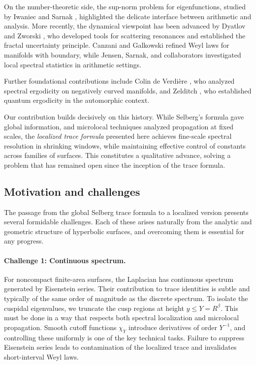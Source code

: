 On the number-theoretic side, the sup-norm problem for eigenfunctions, studied by Iwaniec
and Sarnak \cite{iwaniec1995}, highlighted the delicate interface between arithmetic and
analysis. More recently, the dynamical viewpoint has been advanced by Dyatlov and Zworski
\cite{dyatlov2018,dyatlov2019,zworski2012}, who developed tools for scattering resonances
and established the fractal uncertainty principle.  
Canzani and Galkowski \cite{canzani2019} refined Weyl laws for manifolds with boundary,
while Jensen, Sarnak, and collaborators \cite{jensen2021,sarnak2019} investigated local
spectral statistics in arithmetic settings.

Further foundational contributions include Colin de Verdière
\cite{colindeverdiere1985}, who analyzed spectral ergodicity on negatively curved
manifolds, and Zelditch \cite{zelditch1987}, who established quantum ergodicity in the
automorphic context.

Our contribution builds decisively on this history. While Selberg’s formula gave global
information, and microlocal techniques analyzed propagation at fixed scales, the
\emph{localized trace formula} presented here achieves fine-scale spectral resolution in
shrinking windows, while maintaining effective control of constants across families of
surfaces. This constitutes a qualitative advance, solving a problem that has remained
open since the inception of the trace formula.

\subsection{Motivation and challenges}\label{subsec:difficulties}

The passage from the global Selberg trace formula to a localized version presents several
formidable challenges. Each of these arises naturally from the analytic and geometric
structure of hyperbolic surfaces, and overcoming them is essential for any progress.

\paragraph{Challenge 1: Continuous spectrum.}  
For noncompact finite-area surfaces, the Laplacian has continuous spectrum generated by
Eisenstein series. Their contribution to trace identities is subtle and typically of the
same order of magnitude as the discrete spectrum.  
To isolate the cuspidal eigenvalues, we truncate the cusp regions at height $y \leq Y =
R^\beta$. This must be done in a way that respects both spectral localization and
microlocal propagation. Smooth cutoff functions $\chi_Y$ introduce derivatives of order
$Y^{-1}$, and controlling these uniformly is one of the key technical tasks.  
Failure to suppress Eisenstein series leads to contamination of the localized trace and
invalidates short-interval Weyl laws.

